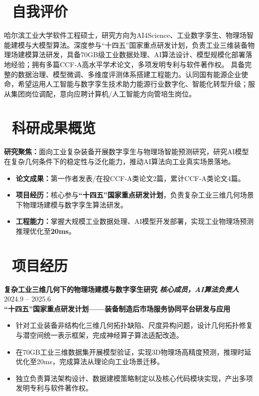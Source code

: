 \documentclass[11pt]{article}
\begin{document}
\section{\makebox[\widthof{\faUser}][c]{\color{CVBlue}\faUser}\ 自我评价}
哈尔滨工业大学软件工程硕士，研究方向为AI4Science、工业数字孪生、物理场智能建模与大模型算法。深度参与“十四五”国家重点研发计划，负责工业三维装备物理场建模算法研发，具备70GB级工业数据处理、AI算法设计、模型规模化部署落地经验；拥有多篇CCF‑A高水平学术论文，多项发明专利与软件著作权。
具备完整的数据治理、模型微调、多维度评测体系搭建工程能力。认同国有能源企业使命，希望运用人工智能与数字孪生技术助力能源行业数字化、智能化转型升级；服从集团岗位调配，意向应聘计算机/人工智能方向管培生岗位。

\section{\makebox[\widthof{\faBookmark}][c]{\color{CVBlue}\faBookmark}\ 科研成果概览} 
\textbf{研究聚焦：}面向工业复杂装备开展数字孪生与物理场智能预测研究，研究AI模型在复杂几何条件下的稳定性与泛化能力，推动AI算法向工业真实场景落地。
\begin{itemize}[leftmargin=1.5em]
    \item \textbf{论文成果：}第一作者发表/在投CCF‑A类论文2篇，累计CCF‑A类论文4篇。
    \item \textbf{项目经历：}核心参与\textbf{“十四五”国家重点研发计划}，负责复杂工业三维几何场景下物理场建模与数字孪生算法研发。
    \item \textbf{工程能力：}掌握大规模工业数据处理、AI模型开发部署，实现工业物理场预测推理优化至\textbf{20ms}。
\end{itemize}

\section{\makebox[\widthof{\faBriefcase}][c]{\color{CVBlue}\faBriefcase}\ 项目经历}
\textbf{复杂工业三维几何下的物理场建模与数字孪生研究}
\textit{\textbf{核心成员，AI算法负责人}}
\hfill 2024.9 -- 2025.6\\[0.2em]
\textcolor{CVBlue}{\textbf{“十四五”国家重点研发计划——装备制造后市场服务协同平台研发与应用}}
\begin{itemize}
    \item 针对工业装备非结构化三维几何拓扑缺陷、尺度异构问题，设计几何拓扑修复与潜空间统一表示框架，完成神经算子算法适配改造。
    \item 在70GB工业三维数据集开展模型验证，实现3D物理场高精度预测，推理时延优化至20ms，完成算法从理论向工业场景迁移。
    \item 独立负责算法架构设计、数据建模策略制定以及核心代码模块实现，产出多项发明专利与软件著作权。
\end{itemize}
\end{document}
